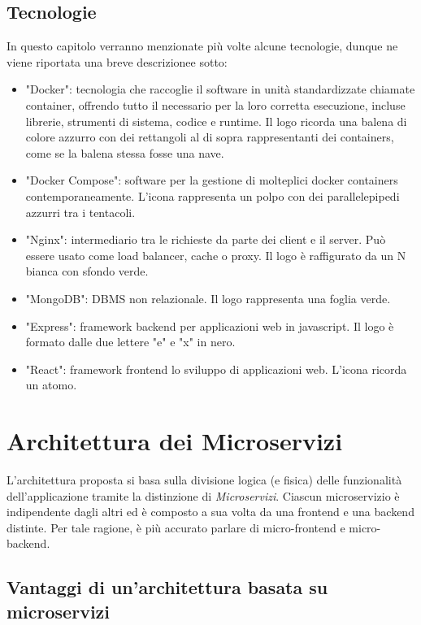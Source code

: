 \documentclass{report}
\begin{document}
\subsection*{Tecnologie}

In questo capitolo verranno menzionate più volte alcune tecnologie, dunque ne viene riportata una breve descrizionee sotto:
\begin{itemize}
	\item "Docker": tecnologia che raccoglie il software in unità standardizzate chiamate container, offrendo tutto il necessario per la loro corretta esecuzione, incluse librerie, strumenti di sistema, codice e runtime. Il logo ricorda una balena di colore azzurro con dei rettangoli al di sopra rappresentanti dei containers, come se la balena stessa fosse una nave.
	\item "Docker Compose": software per la gestione di molteplici docker containers contemporaneamente. L'icona rappresenta un polpo con dei parallelepipedi azzurri tra i tentacoli.
	\item "Nginx": intermediario tra le richieste da parte dei client e il server. Può essere usato come load balancer, cache o proxy. Il logo è raffigurato da un N bianca con sfondo verde.
	\item "MongoDB": DBMS non relazionale. Il logo rappresenta una foglia verde.
	\item "Express": framework backend per applicazioni web in javascript. Il logo è formato dalle due lettere "e" e "x" in nero.
	\item "React": framework frontend lo sviluppo di applicazioni web. L'icona ricorda un atomo.
\end{itemize}

\section{Architettura dei Microservizi}

L'architettura proposta si basa sulla divisione logica (e fisica) delle funzionalità dell'applicazione tramite la distinzione di \textit{Microservizi}. Ciascun microservizio è indipendente dagli altri ed è composto a sua volta da una frontend e una backend distinte. Per tale ragione, è più accurato parlare di micro-frontend e micro-backend.

\subsection*{Vantaggi di un'architettura basata su microservizi}
\end{document}
